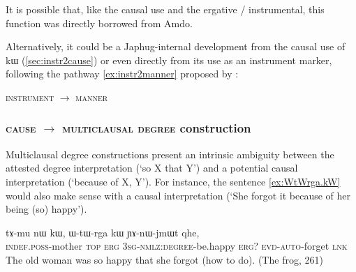 \documentclass[oldfontcommands,oneside,a4paper,11pt]{article}
\newcommand{\ipa}[1]{{\phon #1}} %
\begin{document}
It is possible that, like the causal use and the ergative / instrumental, this function was directly borrowed from Amdo.

Alternatively, it could be a Japhug-internal development from the causal use of \ipa{kɯ}  (\ref{sec:instr2cause}) or even directly from its use as an instrument marker, following the pathway \ref{ex:instr2manner} proposed by \citet[180]{heine-kuteva02}:
   \begin{exe}
\ex \label{ex:instr2manner}
\glt \textsc{instrument} $\rightarrow$ \textsc{manner} 
\end{exe}

 

\subsubsection{\textsc{cause} $\rightarrow$ \textsc{multiclausal degree} construction} \label{sec:cause2degree}

Multiclausal degree constructions  present an intrinsic ambiguity between the attested degree interpretation (`so X that Y') and a potential causal interpretation (`because of X, Y').  For instance, the sentence \ref{ex:WtWrga.kW} would also make sense  with a causal interpretation (`She forgot it because of her being (so) happy').



 \begin{exe} 
 \ex \label{ex:WtWrga.kW}
\gll 
\ipa{tɤ-mu}  	\ipa{nɯ}  	\ipa{kɯ,}  	  	\ipa{ɯ-tɯ-rga}  	\ipa{kɯ}  	\ipa{ɲɤ-nɯ-jmɯt}  	\ipa{qhe,}  \\
\textsc{indef.poss}-mother \textsc{top} \textsc{erg} \textsc{3sg-nmlz:degree}-be.happy \textsc{erg?} \textsc{evd-auto}-forget  \textsc{lnk} \\
\glt The old woman was so happy that she forgot (how to do). (The frog, 261)
 \end{exe} 
 
 

% 
 
\end{document}
